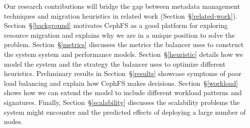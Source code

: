 Our research contributions will bridge the gap between metadata management techniques and migration heuristics in related work (Section~\S\ref{related-work}). Section~\S\ref{background} motivates CephFS as a good platform for exploring resource migration and explains why we are in a unique position to solve the problem. Section~\S\ref{metrics} discusses the metrics the balancer uses to construct the system system and performance models. Section~\S\ref{heuristic} details how we model the system and the strategy the balancer uses to optimize different heuristics. Preliminary results in Section~\S\ref{results} showcase symptoms of poor load balancing and explain how CephFS makes decisions. Section~\S\ref{workload} shows how we can extend the model to include different workload patterns and signatures. Finally, Section~\S\ref{scalability} discusses the scalability problems the system might encounter and the predicted effects of deploying a large number of nodes. 








